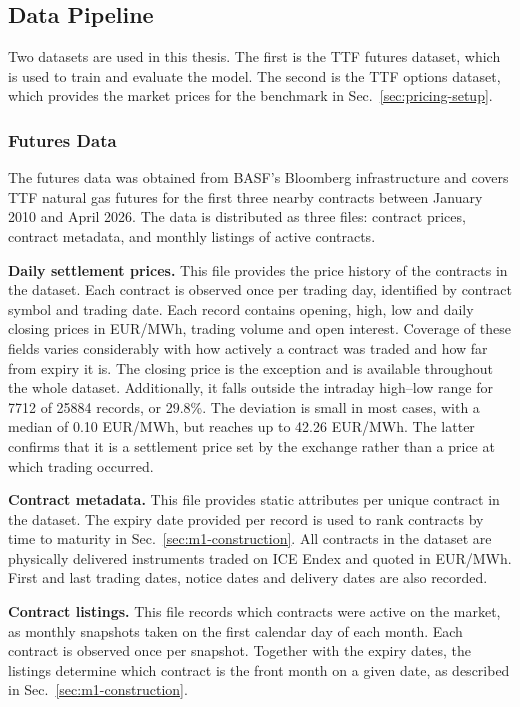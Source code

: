 \subsection{Data Pipeline}\label{sec:data-pipeline}
Two datasets are used in this thesis. The first is the TTF futures dataset, which is used to train and evaluate the model. The second is the TTF options dataset, which provides the market prices for the benchmark in Sec.~\ref{sec:pricing-setup}.

\subsubsection{Futures Data}\label{sec:futures-data}
The futures data was obtained from BASF's Bloomberg infrastructure and covers
TTF natural gas futures for the first three nearby contracts between January
2010 and April 2026. The data is distributed as three files: contract prices, contract metadata, and monthly listings of active contracts.

\textbf{Daily settlement prices.} This file provides the price history of the contracts in the dataset.  Each contract is observed once per trading day, identified by contract symbol and trading date. Each record contains opening, high, low and daily closing prices in EUR/MWh, trading volume and open interest. Coverage of these fields varies considerably with how actively a contract was traded and how far from expiry it is. The closing price is the exception and is available throughout the whole dataset. Additionally, it falls outside the intraday high–low range for \num{7712} of \num{25884}  records, or 29.8\%. The deviation is small in most cases, with a median of \num{0.10} EUR/MWh, but reaches up to \num{42.26} EUR/MWh. The latter confirms that it is a settlement price set by the exchange rather than a price at which trading occurred.

\textbf{Contract metadata.} This file provides static attributes per unique contract in the dataset. The expiry date provided per record is used to rank contracts by time to maturity in Sec.~\ref{sec:m1-construction}. All contracts in the dataset are physically delivered instruments traded on ICE Endex and quoted in EUR/MWh. First and last trading dates, notice dates and delivery dates are also recorded.

\textbf{Contract listings.} This file records which contracts were active on the market, as monthly snapshots taken on the first calendar day of each month. Each contract is observed once per snapshot. Together with the expiry dates, the listings determine which contract is the front month on a given date, as described in Sec.~\ref{sec:m1-construction}.

